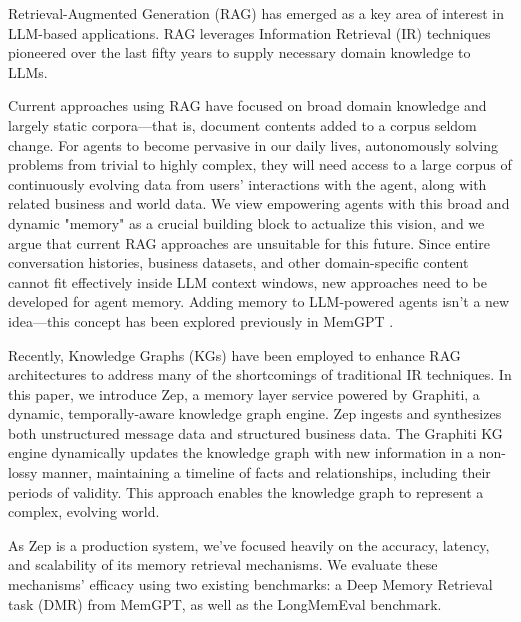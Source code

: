 \documentclass{article}
\begin{document}
Retrieval-Augmented Generation (RAG) has emerged as a key area of interest in LLM-based applications. RAG leverages Information Retrieval (IR) techniques pioneered over the last fifty years\cite{sparckjones1972} to supply necessary domain knowledge to LLMs.

Current approaches using RAG have focused on broad domain knowledge and largely static corpora—that is, document contents added to a corpus seldom change. For agents to become pervasive in our daily lives, autonomously solving problems from trivial to highly complex, they will need access to a large corpus of continuously evolving data from users' interactions with the agent, along with related business and world data. We view empowering agents with this broad and dynamic "memory" as a crucial building block to actualize this vision, and we argue that current RAG approaches are unsuitable for this future. Since entire conversation histories, business datasets, and other domain-specific content cannot fit effectively inside LLM context windows, new approaches need to be developed for agent memory. Adding memory to LLM-powered agents isn't a new idea—this concept has been explored previously in MemGPT \cite{memgpt}.

Recently, Knowledge Graphs (KGs) have been employed to enhance RAG architectures to address many of the shortcomings of traditional IR techniques\cite{graphrag}. In this paper, we introduce Zep\cite{zep}, a memory layer service powered by Graphiti\cite{graphiti}, a dynamic, temporally-aware knowledge graph engine. Zep ingests and synthesizes both unstructured message data and structured business data. The Graphiti KG engine dynamically updates the knowledge graph with new information in a non-lossy manner, maintaining a timeline of facts and relationships, including their periods of validity. This approach enables the knowledge graph to represent a complex, evolving world.

As Zep is a production system, we've focused heavily on the accuracy, latency, and scalability of its memory retrieval mechanisms. We evaluate these mechanisms' efficacy using two existing benchmarks: a Deep Memory Retrieval task (DMR) from MemGPT\cite{memgpt}, as well as the LongMemEval benchmark\cite{longmemeval}.
\end{document}
